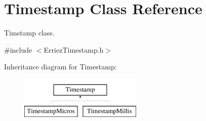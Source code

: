 \hypertarget{class_timestamp}{}\section{Timestamp Class Reference}
\label{class_timestamp}


Timstamp class.  




{\ttfamily \#include $<$Erriez\+Timestamp.\+h$>$}

Inheritance diagram for Timestamp\+:\begin{figure}[H]
\begin{center}
\leavevmode
\includegraphics[height=2.000000cm]{class_timestamp}
\end{center}
\end{figure}
